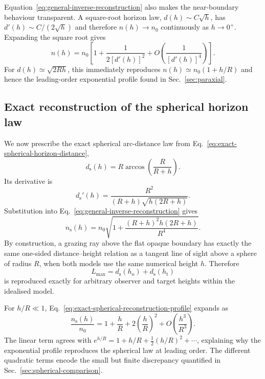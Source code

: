 Equation~\eqref{eq:general-inverse-reconstruction} also makes the near-boundary
behaviour transparent. A square-root horizon law,
$d(h)\sim C\sqrt{h}$, has $d'(h)\sim C/(2\sqrt{h})$ and therefore
$n(h)\to n_0$ continuously as $h\to0^+$. Expanding the square root gives
\begin{equation}
    n(h)
    =
    n_0
    \left[
        1+\frac{1}{2[d'(h)]^2}
        +O\!\left(\frac{1}{[d'(h)]^4}\right)
    \right].
    \label{eq:inverse-near-boundary-expansion}
\end{equation}
For $d(h)\simeq\sqrt{2Rh}$, this immediately reproduces
$n(h)\simeq n_0(1+h/R)$ and hence the leading-order exponential profile found
in Sec.~\ref{sec:paraxial}.

\subsection{Exact reconstruction of the spherical horizon law}

We now prescribe the exact spherical arc-distance law from
Eq.~\eqref{eq:exact-spherical-horizon-distance},
\begin{equation}
    d_{\mathrm{s}}(h)
    =
    R\arccos\!\left(\frac{R}{R+h}\right).
\end{equation}
Its derivative is
\begin{equation}
    d_{\mathrm{s}}'(h)
    =
    \frac{R^2}
    {(R+h)\sqrt{h(2R+h)}}.
    \label{eq:spherical-horizon-derivative}
\end{equation}
Substitution into Eq.~\eqref{eq:general-inverse-reconstruction} gives
\begin{equation}
    n_{\mathrm{s}}(h)
    =
    n_0
    \sqrt{
        1+
        \frac{(R+h)^2h(2R+h)}{R^4}
    }.
    \label{eq:exact-spherical-reconstruction-profile}
\end{equation}
By construction, a grazing ray above the flat opaque boundary has exactly the
same one-sided distance--height relation as a tangent
line of sight above a sphere of radius $R$, when both models use the same
numerical height $h$. Therefore
\begin{equation}
    L_{\max}
    =
    d_{\mathrm{s}}(h_{\mathrm{o}})
    +
    d_{\mathrm{s}}(h_{\mathrm{t}})
\end{equation}
is reproduced exactly for arbitrary observer and target heights within the
idealised model.

For $h/R\ll1$, Eq.~\eqref{eq:exact-spherical-reconstruction-profile} expands as
\begin{equation}
    \frac{n_{\mathrm{s}}(h)}{n_0}
    =
    1
    +\frac{h}{R}
    +2\left(\frac{h}{R}\right)^2
    +O\!\left(\frac{h^3}{R^3}\right).
    \label{eq:spherical-profile-small-height}
\end{equation}
The linear term agrees with
$e^{h/R}=1+h/R+\tfrac12(h/R)^2+\cdots$, explaining why the exponential
profile reproduces the spherical law at leading order. The different
quadratic terms encode the small but finite discrepancy quantified in
Sec.~\ref{sec:spherical-comparison}.

